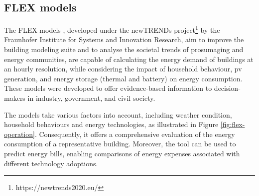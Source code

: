 \subsection{FLEX models}

The FLEX models \cite{newtrends}, developed under the newTRENDs project\footnote{https://newtrends2020.eu/} by the Fraunhofer Institute for Systems and Innovation Research, 
aim to improve the building modeling suite and to analyse the societal trends of prosumaging and energy communities, 
are capable of calculating the energy demand of buildings at an hourly resolution,
while considering the impact of household behaviour, \gls{pv} generation, and energy storage (thermal and battery) on energy consumption. 
These models were developed to offer evidence-based information to decision-makers in industry, government, and civil society. 

The models take various factors into account, including weather condition, household behaviours and energy technologies, as illustrated in Figure \ref{fig:flex-operation}.
Consequently, it offers a comprehensive evaluation of the energy consumption of a representative building. 
Moreover, the tool can be used to predict energy bills, enabling comparisons of energy expenses associated with different technology adoptions. 



